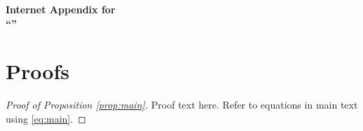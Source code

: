 


\setcounter{page}{1}
\setcounter{equation}{0}
\setcounter{figure}{0}
\setcounter{table}{0}
\setcounter{section}{0}
\renewcommand{\theequation}{IA.\arabic{equation}}
\renewcommand{\thefigure}{IA.\Roman{figure}}
\renewcommand{\thetable}{IA.\Roman{table}}
\renewcommand{\thesection}{IA.\arabic{section}}
\renewcommand{\thesubsection}{\thesection.\arabic{subsection}}



\begin{center}
{\Large \bf Internet Appendix for \\ ``\Title''}
\end{center}

\bigskip



\section{Proofs} \label{ia:proof}

\noindent
\begin{proof}[Proof of Proposition \ref{prop:main}]
    Proof text here. Refer to equations in main text using \eqref{eq:main}.
\end{proof}


